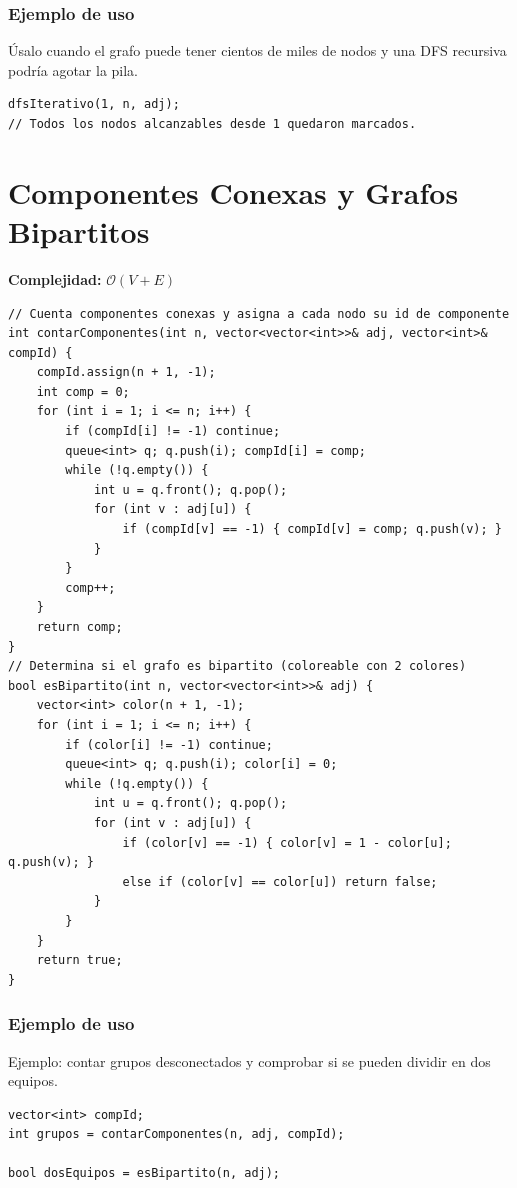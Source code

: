 \documentclass[10pt,twocolumn,letterpaper]{report}
\begin{document}
\subsubsection*{Ejemplo de uso}
Úsalo cuando el grafo puede tener cientos de miles de nodos y una DFS recursiva podría agotar la pila.
\begin{lstlisting}
dfsIterativo(1, n, adj);
// Todos los nodos alcanzables desde 1 quedaron marcados.
\end{lstlisting}


\section{Componentes Conexas y Grafos Bipartitos}
\textbf{Complejidad:} $\mathcal{O}(V + E)$
\begin{lstlisting}
// Cuenta componentes conexas y asigna a cada nodo su id de componente
int contarComponentes(int n, vector<vector<int>>& adj, vector<int>& compId) {
    compId.assign(n + 1, -1);
    int comp = 0;
    for (int i = 1; i <= n; i++) {
        if (compId[i] != -1) continue;
        queue<int> q; q.push(i); compId[i] = comp;
        while (!q.empty()) {
            int u = q.front(); q.pop();
            for (int v : adj[u]) {
                if (compId[v] == -1) { compId[v] = comp; q.push(v); }
            }
        }
        comp++;
    }
    return comp;
}
// Determina si el grafo es bipartito (coloreable con 2 colores)
bool esBipartito(int n, vector<vector<int>>& adj) {
    vector<int> color(n + 1, -1);
    for (int i = 1; i <= n; i++) {
        if (color[i] != -1) continue;
        queue<int> q; q.push(i); color[i] = 0;
        while (!q.empty()) {
            int u = q.front(); q.pop();
            for (int v : adj[u]) {
                if (color[v] == -1) { color[v] = 1 - color[u]; q.push(v); }
                else if (color[v] == color[u]) return false;
            }
        }
    }
    return true;
}
\end{lstlisting}
\subsubsection*{Ejemplo de uso}
Ejemplo: contar grupos desconectados y comprobar si se pueden dividir en dos equipos.
\begin{lstlisting}
vector<int> compId;
int grupos = contarComponentes(n, adj, compId);

bool dosEquipos = esBipartito(n, adj);
\end{lstlisting}
\end{document}
